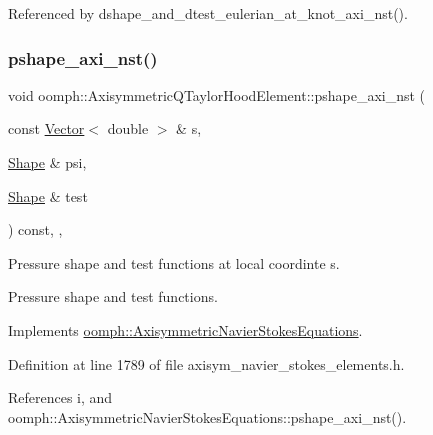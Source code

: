 Referenced by dshape\+\_\+and\+\_\+dtest\+\_\+eulerian\+\_\+at\+\_\+knot\+\_\+axi\+\_\+nst().

\mbox{\label{classoomph_1_1AxisymmetricQTaylorHoodElement_abdb9779d344d9dbe51260e8d01852737}} 
\subsubsection{\texorpdfstring{pshape\+\_\+axi\+\_\+nst()}{pshape\_axi\_nst()}\hspace{0.1cm}{\footnotesize\ttfamily [2/2]}}
{\footnotesize\ttfamily void oomph\+::\+Axisymmetric\+Q\+Taylor\+Hood\+Element\+::pshape\+\_\+axi\+\_\+nst (\begin{DoxyParamCaption}\item[{const \hyperlink{classoomph_1_1Vector}{Vector}$<$ double $>$ \&}]{s,  }\item[{\hyperlink{classoomph_1_1Shape}{Shape} \&}]{psi,  }\item[{\hyperlink{classoomph_1_1Shape}{Shape} \&}]{test }\end{DoxyParamCaption}) const\hspace{0.3cm}{\ttfamily [inline]}, {\ttfamily [protected]}, {\ttfamily [virtual]}}



Pressure shape and test functions at local coordinte s. 

Pressure shape and test functions. 

Implements \hyperlink{classoomph_1_1AxisymmetricNavierStokesEquations_a19a4135581356bf368a7ecae2b315f85}{oomph\+::\+Axisymmetric\+Navier\+Stokes\+Equations}.



Definition at line 1789 of file axisym\+\_\+navier\+\_\+stokes\+\_\+elements.\+h.



References i, and oomph\+::\+Axisymmetric\+Navier\+Stokes\+Equations\+::pshape\+\_\+axi\+\_\+nst().

\mbox{\label{classoomph_1_1AxisymmetricQTaylorHoodElement_a89c18769297b69e2e3522d83c8b68d73}} 
